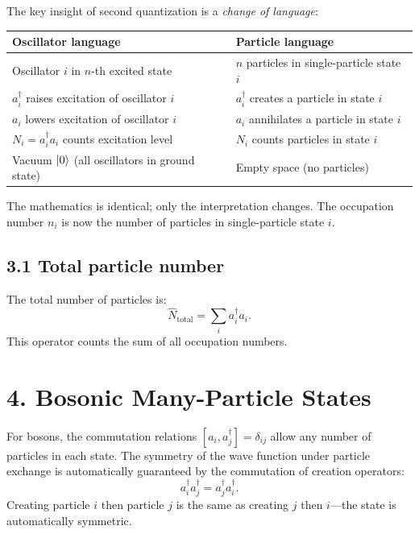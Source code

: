 \documentclass[12pt,a4paper]{article}
\begin{document}
The key insight of second quantization is a \emph{change of language}:
\begin{center}
\begin{tabular}{l l}
\textbf{Oscillator language} & \textbf{Particle language} \\
\hline
Oscillator $i$ in $n$-th excited state & $n$ particles in single-particle state $i$ \\
$a_i^\dagger$ raises excitation of oscillator $i$ & $a_i^\dagger$ creates a particle in state $i$ \\
$a_i$ lowers excitation of oscillator $i$ & $a_i$ annihilates a particle in state $i$ \\
$N_i = a_i^\dagger a_i$ counts excitation level & $N_i$ counts particles in state $i$ \\
Vacuum $\ket{0}$ (all oscillators in ground state) & Empty space (no particles) \\
\end{tabular}
\end{center}

\medskip
The mathematics is identical; only the interpretation changes.  The occupation number $n_i$ is now the number of particles in single-particle state $i$.

\subsection{3.1 Total particle number}

The total number of particles is:
\[
    \hat{N}_{\text{total}} = \sum_i a_i^\dagger a_i.
\]
This operator counts the sum of all occupation numbers.

\section{4. Bosonic Many-Particle States}

For bosons, the commutation relations $[a_i, a_j^\dagger] = \delta_{ij}$ allow any number of particles in each state.  The symmetry of the wave function under particle exchange is automatically guaranteed by the commutation of creation operators:
\[
    a_i^\dagger a_j^\dagger = a_j^\dagger a_i^\dagger.
\]
Creating particle $i$ then particle $j$ is the same as creating $j$ then $i$---the state is automatically symmetric.

\end{document}
